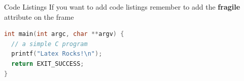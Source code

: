 \begin{frame}[fragile]{Code Listings}
  If you want to add code listings remember to add the \textbf{fragile} attribute on the frame
  \begin{lstlisting}[language=C++, frame=single, xleftmargin=4pt, xrightmargin=4pt]
int main(int argc, char **argv) {
  // a simple C program
  printf("Latex Rocks!\n");
  return EXIT_SUCCESS;
}
  \end{lstlisting}
\end{frame}
